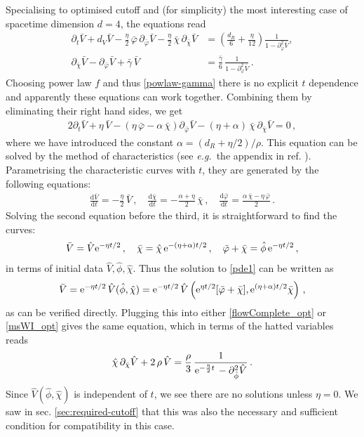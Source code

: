 \documentclass[11pt]{book} %
\newcommand\eg{\textit{e.g.}\ }
\newcommand{\bp}{\bar \varphi}
\newcommand{\bc}{\bar \chi}
\newcommand{\bV}{\bar V}
\newcommand{\hV}{\hat V}
\newcommand{\hp}{\hat \phi}
\newcommand{\hc}{\hat \chi}
\numberwithin{equation}{chapter}
\begin{document}
Specialising to optimised cutoff and (for simplicity) the most interesting case of spacetime dimension $d=4$,
the equations read
\begin{align}
  \label{flowComplete_opt}
  \partial_t\bar{V}+
  d_V \bar V - \frac{\eta}{2} \, \bar \varphi \, \partial_{\bar\varphi}\bar V -\frac{\eta}{2} \, \bar \chi \, \partial_{\bar\chi}\bar V &= \left(  \frac{d_R}{6} + \frac{\eta}{12} \right) \frac{1}{1 -  \partial^2_{\bar\varphi}\bar V},\\
  \label{msWI_opt}
  \partial_{\bar\chi}\bar V - \partial_{\bar\varphi}\bar V + \bar{\gamma} \, \bar V &= \frac{\bar{\gamma}}{6} \, \frac{1}{1 - \partial^2_{\bar\varphi}\bar V}\,.
\end{align}
Choosing power law $f$ and thus \eqref{powlaw-gamma} there is no explicit $t$ dependence and apparently
these equations can work together. Combining them by eliminating their right hand sides, we get
\begin{align}
  \label{pde1}
  2\partial_t\bar{V}+\eta \, \bar{V}-\left(\eta \, \bar\varphi-\alpha \, \bc\right)\partial_{\bar{\varphi}}\bar{V}-(\eta+\alpha) \, \bar\chi \, \partial_{\bar{\chi}} \bar{V}=0\,,
\end{align}
where we have introduced the constant $\alpha = (d_R+\eta/2)/\rho$.
This equation can be solved by the method of characteristics
(see \eg the appendix in ref. \cite{Dietz:2015owa}). Parametrising the characteristic curves with $t$, they are generated by the following equations:
\begin{align}
  \frac{\mathrm d\bV}{\mathrm dt} = -\frac{\eta}{2} \, \bV\,,
  \quad
  \frac{\mathrm d\bc}{\mathrm dt}=-\frac{\alpha+\eta}{2} \, \bc\,,
  \quad
  \frac{\mathrm d\bp}{\mathrm dt}=\frac{\alpha\,\bc-\eta\,\bp}{2}\,.
\end{align}
Solving the second equation before the third, it is straightforward to find the curves:
\begin{align}
  \bV = \hV {\rm e}^{-\eta t/2}\,,\quad \bc = \hc\, {\rm e}^{-(\eta+\alpha)t/2}\,,\quad \bp+\bc = \hp\, {\rm e}^{-\eta t/2}\,,
\end{align}
in terms of initial data $\hV,\hp,\hc$.
Thus the solution to \eqref{pde1} can be written as
\begin{align}
  \bV ={\rm e}^{-\eta t/2}\, \hV(\hp,\hc) ={\rm e}^{-\eta t/2} \,\hV\left({\rm e}^{\eta t/2}[\bp+\bc],{\rm e}^{(\eta+\alpha)t/2}\bc\right)\,,
\end{align}
as can be verified directly. Plugging this into either \eqref{flowComplete_opt} or \eqref{msWI_opt}
gives the same equation, which in terms of the hatted variables reads
\begin{align}
  \hc \, \partial_{\hc}\hV + 2 \, \rho \, \hV = \frac{\rho}{3} \, \frac{1}{{\rm e}^{-\frac{\eta}{2} t} \,-\partial^2_{\hp}\hV}\,.
\end{align}
Since $\hV(\hp,\hc)$ is independent of $t$, we see there are no solutions unless $\eta=0$.
We saw in sec. \ref{sec:required-cutoff} that this was also the necessary and sufficient condition for
compatibility in this case.
\end{document}
